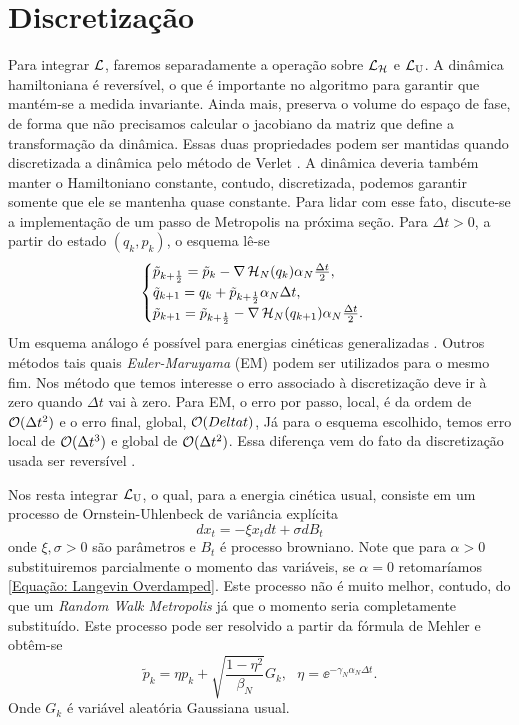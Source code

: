 \section{Discretização}
\label{Seção: Discretização}

Para integrar $\operatorname{\mathcal{L}}$, faremos separadamente a operação sobre $\operatorname{\mathcal{L}}_{\operatorname{\mathcal{H}}}$ e $\operatorname{\mathcal{L}}_{\operatorname{U}}$. A dinâmica hamiltoniana é reversível, o que é importante no algoritmo para garantir que mantém-se a medida invariante. Ainda mais, preserva o volume do espaço de fase, de forma que não precisamos calcular o jacobiano da matriz que define a transformação da dinâmica. Essas duas propriedades podem ser mantidas quando discretizada a dinâmica pelo método de Verlet \cite{Chafa2018}\cite{leimmolecular}. A dinâmica deveria também manter o Hamiltoniano constante, contudo, discretizada, podemos garantir somente que ele se mantenha quase constante. Para lidar com esse fato, discute-se a implementação de um passo de Metropolis na próxima seção. Para $\Delta t > 0$, a partir do estado $(q_k, p_k)$, o esquema lê-se
\begin{equation}
\begin{cases}
	\tilde{p}_{k+\frac{1}{2}} = \tilde{p}_k - \nabla \operatorname{\mathcal{H}}_N(q_k) \alpha_N \frac{\Delta t}{2}, \\
	\tilde{q}_{k+1} = q_k + \tilde{p}_{k + \frac{1}{2}} \alpha_N \Delta t, \\
	\tilde{p}_{k+1} = \tilde{p}_{k+\frac{1}{2}} - \nabla \operatorname{\mathcal{H}}_N(q_{k+1}) \alpha_N \frac{\Delta t}{2}.
\end{cases}
\label{Equation: Verlet}
\end{equation}
Um esquema análogo é possível para energias cinéticas generalizadas \cite{Stoltz2018}. Outros métodos tais quais \textit{Euler-Maruyama} (EM) \cite[Capítulo~7]{leimmolecular} podem ser utilizados para o mesmo fim. Nos método que temos interesse o erro associado à discretização deve ir à zero quando $\Delta t$ vai à zero. Para EM, o erro por passo, local, é da ordem de $\mathcal{O}{(\Delta t^2)}$ e o erro final, global, $\mathcal{O}{(Delta t)}$, Já para o esquema escolhido, temos erro local de  $\mathcal{O}{(\Delta t^3)}$ e global de  $\mathcal{O}{(\Delta t^2)}$. Essa diferença vem do fato da discretização usada ser reversível \cite[Capítulo~5]{handbookmontecarlo}. 

Nos resta integrar $\operatorname{\mathcal{L}}_{\operatorname{U}}$, o qual, para a energia cinética usual, consiste em um processo de Ornstein-Uhlenbeck de variância explícita $$dx_t = - \xi x_t dt + \sigma dB_t$$ onde $\xi, \sigma > 0$ são parâmetros e $B_t$ é processo browniano. Note que para $\alpha > 0$ substituiremos parcialmente o momento das variáveis, se $\alpha = 0$ retomaríamos \ref{Equação: Langevin Overdamped}. Este processo não é muito melhor, contudo, do que um \textit{Random Walk Metropolis} \cite[Capítulo~5]{handbookmontecarlo} já que o momento seria completamente substituído. Este processo pode ser resolvido a partir da fórmula de Mehler e obtêm-se
\begin{equation}
\tilde{p}_k = \eta p_k + \sqrt{\frac{1-\eta^2}{\beta_N}} G_k, \ \ \ \eta = \ee^{-\gamma_N \alpha_N \Delta t}.
\label{Equation: Mehler}
\end{equation}
Onde $G_k$ é variável aleatória Gaussiana usual.

